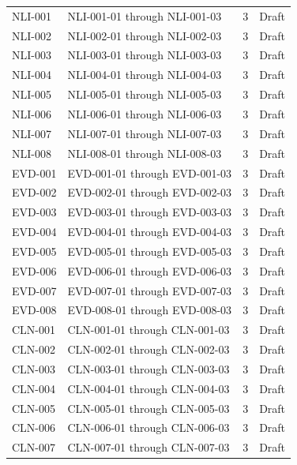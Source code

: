 \documentclass[11pt,letterpaper]{article}
\begin{document}
\begin{small}
\begin{longtable}{@{}L{0.14\textwidth}L{0.56\textwidth}L{0.12\textwidth}L{0.10\textwidth}@{}}
NLI-001 & NLI-001-01 through NLI-001-03 & 3 & Draft \\
\addlinespace[2pt]
NLI-002 & NLI-002-01 through NLI-002-03 & 3 & Draft \\
\addlinespace[2pt]
NLI-003 & NLI-003-01 through NLI-003-03 & 3 & Draft \\
\addlinespace[2pt]
NLI-004 & NLI-004-01 through NLI-004-03 & 3 & Draft \\
\addlinespace[2pt]
NLI-005 & NLI-005-01 through NLI-005-03 & 3 & Draft \\
\addlinespace[2pt]
NLI-006 & NLI-006-01 through NLI-006-03 & 3 & Draft \\
\addlinespace[2pt]
NLI-007 & NLI-007-01 through NLI-007-03 & 3 & Draft \\
\addlinespace[2pt]
NLI-008 & NLI-008-01 through NLI-008-03 & 3 & Draft \\
\addlinespace[2pt]
EVD-001 & EVD-001-01 through EVD-001-03 & 3 & Draft \\
\addlinespace[2pt]
EVD-002 & EVD-002-01 through EVD-002-03 & 3 & Draft \\
\addlinespace[2pt]
EVD-003 & EVD-003-01 through EVD-003-03 & 3 & Draft \\
\addlinespace[2pt]
EVD-004 & EVD-004-01 through EVD-004-03 & 3 & Draft \\
\addlinespace[2pt]
EVD-005 & EVD-005-01 through EVD-005-03 & 3 & Draft \\
\addlinespace[2pt]
EVD-006 & EVD-006-01 through EVD-006-03 & 3 & Draft \\
\addlinespace[2pt]
EVD-007 & EVD-007-01 through EVD-007-03 & 3 & Draft \\
\addlinespace[2pt]
EVD-008 & EVD-008-01 through EVD-008-03 & 3 & Draft \\
\addlinespace[2pt]
CLN-001 & CLN-001-01 through CLN-001-03 & 3 & Draft \\
\addlinespace[2pt]
CLN-002 & CLN-002-01 through CLN-002-03 & 3 & Draft \\
\addlinespace[2pt]
CLN-003 & CLN-003-01 through CLN-003-03 & 3 & Draft \\
\addlinespace[2pt]
CLN-004 & CLN-004-01 through CLN-004-03 & 3 & Draft \\
\addlinespace[2pt]
CLN-005 & CLN-005-01 through CLN-005-03 & 3 & Draft \\
\addlinespace[2pt]
CLN-006 & CLN-006-01 through CLN-006-03 & 3 & Draft \\
\addlinespace[2pt]
CLN-007 & CLN-007-01 through CLN-007-03 & 3 & Draft \\

\end{longtable}
\end{small}
\end{document}
